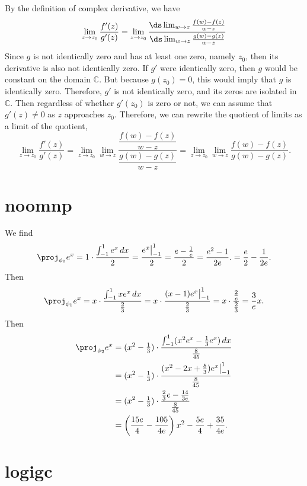 \documentclass[12pt]{article}
\newcommand{\C}{\mathbb{C}}
\begin{document}
By the definition of complex derivative, we have
    \[
        \lim_{z \to z_0} \frac{f'(z)}{g'(z)} 
            = \lim_{z \to z_0} \frac{\ds\lim_{w \to z} \frac{f(w) - f(z)}{w - z}}
                                    {\ds\lim_{w \to z} \frac{g(w) - g(z)}{w - z}}
    \]
    Since $g$ is not identically zero and has at least one zero, namely $z_0$, then its derivative is also not identically zero. If $g'$ were identically zero, then $g$ would be constant on the domain $\C$. But because $g(z_0) = 0$, this would imply that $g$ is identically zero. Therefore, $g'$ is not identically zero, and its zeros are isolated in $\C$. Then regardless of whether $g'(z_0)$ is zero or not, we can assume that $g'(z) \ne 0$ as $z$ approaches $z_0$. Therefore, we can rewrite the quotient of limits as a limit of the quotient,
    \[
        \lim_{z \to z_0} \frac{f'(z)}{g'(z)} 
            = \lim_{z \to z_0} \lim_{w \to z} \frac{\dfrac{f(w) - f(z)}{w - z}}{\dfrac{g(w) - g(z)}{w - z}}
            = \lim_{z \to z_0} \lim_{w \to z} \frac{f(w) - f(z)}{g(w) - g(z)}.
    \]
    
\section{noomnp}

We find
\[
    \proj_{\phi_0} e^x
        = 1 \cdot \frac{\int_{-1}^1 e^x \,dx}{2}
        = \frac{e^x \big|_{-1}^1}{2}
        = \frac{e - \frac1e}{2}
        = \frac{e^2 - 1}{2e}.
        = \frac{e}{2} - \frac1{2e}.
\]
Then
\[
    \proj_{\phi_1} e^x
        = x \cdot \frac{\int_{-1}^1 xe^x \,dx}{\frac23}
        = x \cdot\frac{(x-1)e^x \big|_{-1}^1}{\frac23}
        = x \cdot \frac{\frac2e}{\frac23}
        = \frac{3}{e} x.
\]
Then
\begin{align*}
    \proj_{\phi_2} e^x
        &= (x^2 - \tfrac13) \cdot \frac{\int_{-1}^1 (x^2e^x - \frac13e^x) \,dx}{\frac8{45}} \\
        &= (x^2 - \tfrac13) \cdot\frac{(x^2-2x+\frac53)e^x \big|_{-1}^1}{\frac8{45}} \\
        &= (x^2 - \tfrac13) \cdot \frac{\frac23e - \frac{14}{3e}}{\frac8{45}} \\
        &= \left(\frac{15e}{4} - \frac{105}{4e}\right)x^2 - \frac{5e}{4} + \frac{35}{4e}.
\end{align*}


\section{logigc}
\end{document}
